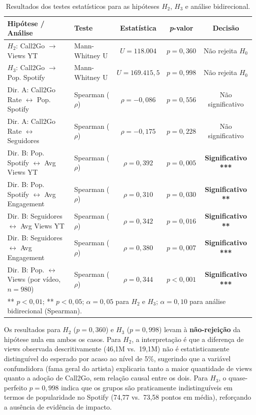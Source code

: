 \documentclass[12pt, a4paper]{article}
\begin{document}
\begin{table}[H]
\centering
\caption{Resultados dos testes estatísticos para as hipóteses $H_2$, $H_3$ e análise bidirecional.}
\label{tab:estatisticos}
\renewcommand{\arraystretch}{1.3}
\begin{tabular}{@{}llccc@{}}
\toprule
\textbf{Hipótese / Análise} & \textbf{Teste} & \textbf{Estatística} & \textbf{\textit{p}-valor} & \textbf{Decisão} \\
\midrule
$H_2$: Call2Go $\to$ Views YT & Mann-Whitney U & $U = 118.004$ & $p = 0{,}360$ & Não rejeita $H_0$ \\
$H_3$: Call2Go $\to$ Pop. Spotify & Mann-Whitney U & $U = 169.415{,}5$ & $p = 0{,}998$ & Não rejeita $H_0$ \\
\midrule
Dir. A: Call2Go Rate $\leftrightarrow$ Pop. Spotify & Spearman ($\rho$) & $\rho = -0{,}086$ & $p = 0{,}556$ & Não significativo \\
Dir. A: Call2Go Rate $\leftrightarrow$ Seguidores & Spearman ($\rho$) & $\rho = -0{,}175$ & $p = 0{,}228$ & Não significativo \\
\midrule
Dir. B: Pop. Spotify $\leftrightarrow$ Avg Views YT & Spearman ($\rho$) & $\rho = 0{,}392$ & $p = 0{,}005$ & \textbf{Significativo ***} \\
Dir. B: Pop. Spotify $\leftrightarrow$ Avg Engagement & Spearman ($\rho$) & $\rho = 0{,}310$ & $p = 0{,}030$ & \textbf{Significativo **} \\
Dir. B: Seguidores $\leftrightarrow$ Avg Views YT & Spearman ($\rho$) & $\rho = 0{,}342$ & $p = 0{,}016$ & \textbf{Significativo **} \\
Dir. B: Seguidores $\leftrightarrow$ Avg Engagement & Spearman ($\rho$) & $\rho = 0{,}380$ & $p = 0{,}007$ & \textbf{Significativo ***} \\
Dir. B: Pop. $\leftrightarrow$ Views (por vídeo, $n=980$) & Spearman ($\rho$) & $\rho = 0{,}344$ & $p < 0{,}001$ & \textbf{Significativo ***} \\
\bottomrule
\multicolumn{5}{l}{\footnotesize *** $p < 0{,}01$; ** $p < 0{,}05$; $\alpha = 0{,}05$ para $H_2$ e $H_3$; $\alpha = 0{,}10$ para análise bidirecional (Spearman).}
\end{tabular}
\end{table}

Os resultados para $H_2$ ($p = 0{,}360$) e $H_3$ ($p = 0{,}998$) levam à \textbf{não-rejeição} da hipótese nula em ambos os casos. Para $H_2$, a interpretação é que a diferença de views observada descritivamente (46,1M vs.\ 19,1M) não é estatisticamente distinguível do esperado por acaso ao nível de 5\%, sugerindo que a variável confundidora (fama geral do artista) explicaria tanto a maior quantidade de views quanto a adoção de Call2Go, sem relação causal entre os dois. Para $H_3$, o quase-perfeito $p = 0{,}998$ indica que os grupos são praticamente indistinguíveis em termos de popularidade no Spotify (74,77 vs.\ 73,58 pontos em média), reforçando a ausência de evidência de impacto.
\end{document}
